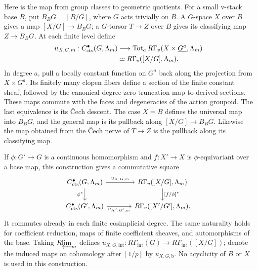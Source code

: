 Here is the map from group classes to geometric quotients.  For a small
v-stack base $B$, put $B_BG=[B/\underline G]$, where $G$ acts trivially
on $B$.  A $G$-space $X$ over $B$ gives a map $[X/G]\to B_BG$; a
$G$-torsor $T\to Z$ over $B$ gives its classifying map $Z\to B_BG$.
At each finite level define
\begin{equation}\label{eq:finite-constant-cochains}
\begin{split}
 u_{X,G,m}:C_{\mathrm{cts}}^{\bullet}(G,\Lambda_m)
 &\longrightarrow
   \operatorname{Tot}_{a}R\Gamma_v
       (X\times\underline{G^a},\Lambda_m)\\
 &\simeq R\Gamma_v([X/G],\Lambda_m).
\end{split}
\end{equation}
In degree $a$, pull a locally constant function on $G^a$ back along
the projection from $X\times\underline{G^a}$.  Its finitely many
clopen fibers define a section of the finite constant sheaf, followed
by the canonical degree-zero truncation map to derived sections.
These maps commute with
the faces and degeneracies of the action groupoid.  The last
equivalence is its \v{C}ech descent.  The case $X=B$ defines the
universal map into $B_BG$, and the general map is its pullback along
$[X/G]\to B_BG$.  Likewise the map obtained from the \v{C}ech nerve
of $T\to Z$ is the pullback along its classifying map.

If $\phi:G'\to G$ is a continuous homomorphism and $f:X'\to X$ is
$\phi$-equivariant over a base map, this construction gives a
commutative square
\begin{equation}\label{eq:constant-cochain-naturality}
\begin{tikzcd}[column sep=large]
 C_{\cts}^{\bullet}(G,\Lambda_m)
     \arrow[r,"u_{X,G,m}"] \arrow[d,"\phi^*"']
   &R\Gamma_v([X/G],\Lambda_m)\arrow[d,"{[f/\phi]^*}"]\\
 C_{\cts}^{\bullet}(G',\Lambda_m)
     \arrow[r,"u_{X',G',m}"']
   &R\Gamma_v([X'/G'],\Lambda_m).
\end{tikzcd}
\end{equation}
It commutes already in each finite cosimplicial degree.  The same
naturality holds for coefficient reduction, maps of finite coefficient
sheaves, and automorphisms of the base.  Taking $R\!\varprojlim_m$ defines
$u_{X,G,\mathrm{int}}:R\Gamma_{\mathrm{int}}(G)\to
R\Gamma_{\mathrm{int}}([X/G])$; denote the induced maps on cohomology
after $[1/p]$ by $u_{X,G,\mathrm b}$.  No acyclicity of $B$ or $X$
is used in this construction.

